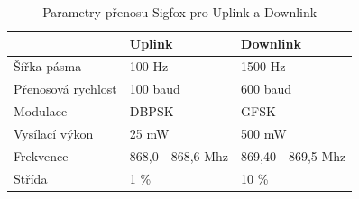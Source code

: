 \documentclass{ctuthesis}
\begin{document}
\begin{table}[]
\begin{tabular}{@{}ll|l@{}}
\toprule
                   & Uplink            & Downlink           \\ \midrule
Šířka pásma        & 100 Hz            & 1500 Hz            \\
Přenosová rychlost & 100 baud          & 600 baud           \\
Modulace           & DBPSK             & GFSK               \\
Vysílací výkon     & 25 mW             & 500 mW             \\
Frekvence          & 868,0 - 868,6 Mhz & 869,40 - 869,5 Mhz \\
Střída             & 1 \%              & 10 \%             
\end{tabular}
\caption{Parametry přenosu Sigfox pro Uplink a Downlink}
\label{tab:upAndDown}
\cite{sigfoxsystem}
\end{table}
\end{document}
